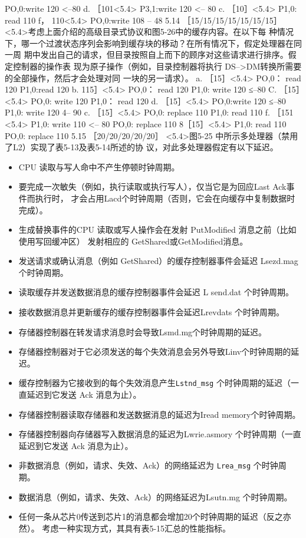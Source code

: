PO,0:write 120 <--80
d. ［101<5.4>
P3,1:write 120 <-- 80
c. ［10］<5.4>
P1,0: read 110
f，
110<5.4>
PO,0:write 108 -- 48
5.14
［15/15/15/15/15/15/15］<5.4>考虑上面介绍的高级目录式协议和图5-26中的缓存内容。在以下每
种情况下，哪一个过渡状态序列会影响到缓存块的移动？在所有情况下，假定处理器在同一周
期中发出自己的请求，但目录按照自上而下的顾序对这些请求进行排序。假定控制器的操作表
现为原子操作（例如，目录控制器将执行 DS-->DM转换所需要的全部操作，然后才会处理对同
一块的另一请求）。
a. ［15］<5.4>
PO,0：
read 120
P1,0:read 120
b. 115］<5.4>
PO,0：
read 120
P1,0: write 120 ≤--80
C. ［15］<5.4>
PO,0: write 120
P1,0：
read 120
d. ［15］<5.4>
PO,0:write 120 ≤--80
P1,0: write 120 4-- 90
c. ［15］<5.4>
PO,0: replace 110
P1,0: read 110
f. ［151 <5.4>
P1,0: write 110 <-- 80
PO,0: replace 110
8［15］<5.4>
P1,0: read 110
PO,0: replace 110
5.15 ［20/20/20/20/20］ <5.4>图5-25 中所示多处理器（禁用了L2）实现了表5-13及表5-14所述的协
议，对此多处理器假定有以下延迟。
\begin{itemize}
    \item CPU 读取与写人命中不产生停顿时钟周期。
    \item 要完成一次敏失（例如，执行读取或执行写人），仅当它是为回应Last Ack事件而执行时，
    才会占用Lacd个时钟周期（否则，它会在向缓存中复制数据时完成）。
    \item 生成替换事件的CPU 读取或写人操作会在发射 PutModified 消息之前（比如使用写回缓冲区）
    发射相应的 GetShared或GetModified消息。
    \item 发送请求或确认消息（例如 GetShared）的缓存控制器事件会延迟 Lsezd.mag 个时钟周期。
    \item 读取缓存并发送数据消息的缓存控制器事件会延迟 L send.dat 个时钟周期。
    \item 接收数据消息并更新缓存的缓存控制器事件会延迟Lrevdats 个时钟周期。
    \item 存储器控制器在转发请求消息时会导致Lsmd.mg个时钟周期的延迟。
    \item 存储器控制器对于它必须发送的每个失效消息会另外导致Linv个时钟周期的延迟。
    \item 缓存控制器为它接收到的每个失效消息产生\verb|Lstnd_msg| 个时钟周期的延迟（一直延迟到它发送
    Ack 消息为止）。
    \item 存储器控制器读取存储器和发送数据消息的延迟为Iread memory个时钟周期。
    \item 存储器控制器向存储器写入数据消息的延迟为Lwrie.asmory 个时钟周期（一直延迟到它发送
    Ack 消息为止）。
    \item 非数据消息（例如，请求、失效、Ack）的网络延迟为 \verb|Lrea_msg| 个时钟周期。
    \item 数据消息（例如，请求、失效、Ack）的网络延迟为Lsutn.mg 个时钟周期。
    \item 任何一条从芯片0传送到芯片1的消息都会增加20个时钟周期的延迟（反之亦然）。
    考虑一种实现方式，其具有表5-15汇总的性能指标。
\end{itemize}
